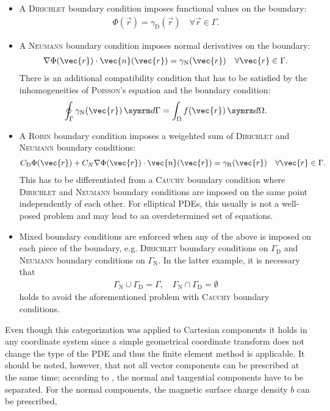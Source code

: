\begin{itemize}
\item A \textsc{Dirichlet} boundary condition imposes functional values on the boundary:
  \begin{gather*}
    \Phi (\vec{r}) = \gamma_{\text{D}} (\vec{r}) \quad \forall \vec{r} \in \Gamma.
  \end{gather*}
\item A \textsc{Neumann} boundary condition imposes normal derivatives on the boundary:
  \begin{gather*}
    \grad \Phi (\vec{r}) \cdot \vec{n} (\vec{r}) = \gamma_{\text{N}} (\vec{r}) \quad \forall \vec{r} \in \Gamma.
  \end{gather*}
  There is an additional compatibility condition that has to be satisfied by the inhomogeneities of \textsc{Poisson}'s equation and the boundary condition:
  \begin{gather*}
    \oint_{\Gamma} \gamma_{\text{N}} (\vec{r}) \, \diff \Gamma = \int_{\Omega} f (\vec{r}) \, \diff \Omega.
  \end{gather*}
\item A \textsc{Robin} boundary condition imposes a weigehted sum of \textsc{Dirichlet} and \textsc{Neumann} boundary conditions:
  \begin{gather*}
    C_{\text{D}} \Phi (\vec{r}) + C_{N} \grad \Phi (\vec{r}) \cdot \vec{n} (\vec{r}) = \gamma_{\text{R}} (\vec{r}) \quad \forall \vec{r} \in \Gamma.
  \end{gather*}
  This has to be differentiated from a \textsc{Cauchy} boundary condition where \textsc{Dirichlet} and \textsc{Neumann} boundary conditions are imposed on the same point independently of each other. For elliptical PDEs, this usually is not a well-posed problem and may lead to an overdetermined set of equations.
\item Mixed boundary conditions are enforced when any of the above is imposed on each piece of the boundary, e.g. \textsc{Dirichlet} boundary conditions on $\Gamma_{\text{D}}$ and \textsc{Neumann} boundary conditions on $\Gamma_{\text{N}}$. In the latter example, it is necessary that
  \begin{gather*}
    \Gamma_{\text{N}} \cup \Gamma_{\text{D}} = \Gamma, \quad \Gamma_{\text{N}} \cap \Gamma_{\text{D}} = \emptyset
  \end{gather*}
  holds to avoid the aforementioned problem with \textsc{Cauchy} boundary conditions.
\end{itemize}
Even though this categorization was applied to Cartesian components it holds in any coordinate system since a simple geometrical coordinate transform does not change the type of the PDE and thus the finite element method is applicable. It should be noted, however, that not all vector components can be prescribed at the same time; according to \cite{Biro15}, the normal and tangential components have to be separated. For the normal components, the magnetic surface charge density $b$ can be prescribed,
